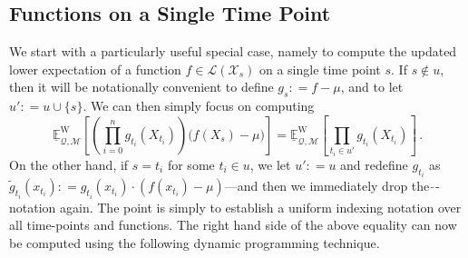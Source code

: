\documentclass[twoside,11pt]{article}
\newcommand{\states}{\mathcal{X}}
\newcommand{\lexp}{\underline{\mathbb{E}}_{\rateset,\mathcal{M}}^\mathrm{W}}
\newcommand{\gambles}{\mathcal{L}}
\newcommand{\rateset}{\mathcal{Q}}
\newcommand{\coloneqq}{:\!=}
\begin{document}
\subsection{Functions on a Single Time Point}\label{sec:funcs_single_time}

We start with a particularly useful special case, namely to compute the updated lower expectation of a function $f\in\gambles(\states_s)$ on a single time point $s$. If $s\notin u$, then it will be notationally convenient to define $g_s\coloneqq f - \mu$, and to let $u'\coloneqq u\cup \{s\}$. We can then simply focus on computing
\begin{equation*}
\lexp\left[ \left(\prod_{i=0}^ng_{t_i}(X_{t_i})\right)\bigl(f(X_s) - \mu\bigr) \right] = \lexp\left[ \prod_{t_i\in u'}g_{t_i}(X_{t_i})\right]\,.
\end{equation*}
On the other hand, if $s = t_i$ for some $t_i\in u$, we let $u'\coloneqq u$ and redefine $g_{t_i}$ as $\tilde{g}_{t_i}(x_{t_i})\coloneqq g_{t_i}(x_{t_i})\cdot (f(x_{t_i})-\mu)$---and then we immediately drop the $\tilde\,$-notation again. The point is simply to establish a uniform indexing notation over all time-points and functions. The right hand side of the above equality can now be computed using the following dynamic programming technique. 
\end{document}
